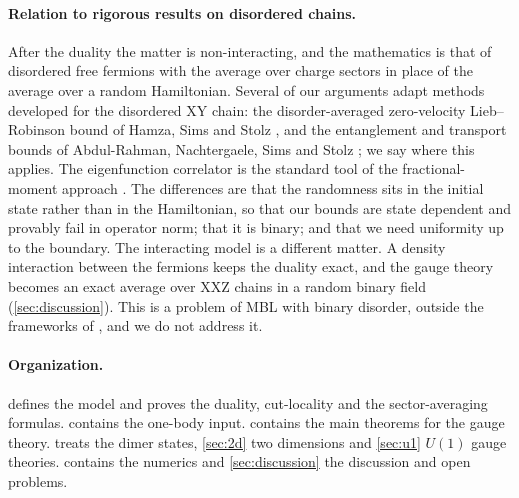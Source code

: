 \paragraph{Relation to rigorous results on disordered chains.}
After the duality the matter is non-interacting, and the mathematics is that of disordered free fermions with
the average over charge sectors in place of the average over a random Hamiltonian.  Several of our arguments
adapt methods developed for the disordered XY chain: the disorder-averaged zero-velocity Lieb--Robinson bound of
Hamza, Sims and Stolz \cite{HSS2012}, and the entanglement and transport bounds of Abdul-Rahman, Nachtergaele,
Sims and Stolz \cite{AbdulRahmanStolz2015,ANSS2016}; we say where this applies.  The eigenfunction correlator is
the standard tool of the fractional-moment approach \cite{AizenmanWarzel2015}.  The differences are that the
randomness sits in the initial state rather than in the Hamiltonian, so that our bounds are state dependent and
provably fail in operator norm; that it is binary; and that we need uniformity up to the boundary.  The interacting
model is a different matter.  A density interaction between the fermions keeps the duality exact, and the gauge
theory becomes an exact average over XXZ chains in a random binary field \cite{SKKM2017b}
(\cref{sec:discussion}).  This is a problem of MBL with binary disorder, outside the frameworks of
\cite{Imbrie2016,DHMP2023,DGHP2024}, and we do not address it.

\paragraph{Organization.}
 defines the model and proves the duality, cut-locality and the sector-averaging formulas.
 contains the one-body input.   contains the main theorems for the gauge theory.
 treats the dimer states, \cref{sec:2d} two dimensions and \cref{sec:u1} $U(1)$ gauge theories.
 contains the numerics and \cref{sec:discussion} the discussion and open problems.
